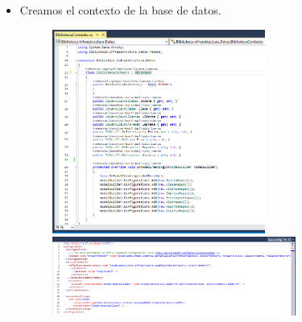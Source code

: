 \documentclass[twoside,twocolumn]{article}
\begin{document}
\begin{itemize}
\begin{figure}[htb]
\begin{center}
\end{center}
\end{figure}
\\
\\
\\
\\
\\
\\
\\
\\
\\
\\
\\
\\
\\
\\
\\
\\
\\
	\item Creamos el contexto de la base de datos.
\begin{figure}[htb]
\begin{center}
\includegraphics[width=7cm]{./Imagenes/4}
\includegraphics[width=8cm]{./Imagenes/4-1}
\end{center}
\end{figure}\\
\\
\\
\\
\\
\\
\\
\\
\\
\\

\end{itemize}
\end{document}
